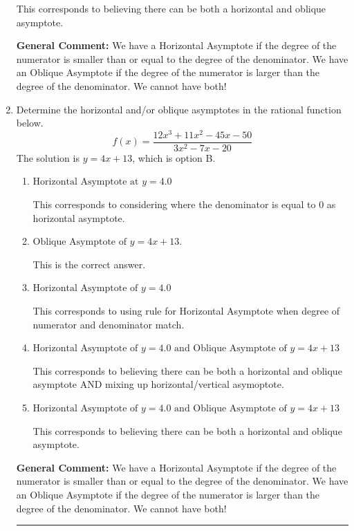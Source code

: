 \documentclass{extbook}[14pt]
\newcommand{\litem}[1]{\item #1

\rule{\textwidth}{0.4pt}}
\begin{document}
\begin{enumerate}
{\begin{enumerate}[label=\Alph*.]
This corresponds to believing there can be both a horizontal and oblique asymptote.
\end{enumerate}

\textbf{General Comment:} We have a Horizontal Asymptote if the degree of the numerator is smaller than or equal to the degree of the denominator. We have an Oblique Asymptote if the degree of the numerator is larger than the degree of the denominator. We cannot have both!
}
\litem{
Determine the horizontal and/or oblique asymptotes in the rational function below.
\[ f(x) = \frac{12x^{3} +11 x^{2} -45 x -50}{3x^{2} -7 x -20} \]The solution is \( y = 4x + 13 \), which is option B.\begin{enumerate}[label=\Alph*.]
\item \( \text{Horizontal Asymptote at } y = 4.0 \)

This corresponds to considering where the denominator is equal to 0 as horizontal asymptote.
\item \( \text{Oblique Asymptote of } y = 4x + 13. \)

This is the correct answer.
\item \( \text{Horizontal Asymptote of } y = 4.0  \)

This corresponds to using rule for Horizontal Asymptote when degree of numerator and denominator match.
\item \( \text{Horizontal Asymptote of } y = 4.0 \text{ and Oblique Asymptote of } y = 4x + 13 \)

This corresponds to believing there can be both a horizontal and oblique asymptote AND mixing up horizontal/vertical asymoptote.
\item \( \text{Horizontal Asymptote of } y = 4.0 \text{ and Oblique Asymptote of } y = 4x + 13 \)

This corresponds to believing there can be both a horizontal and oblique asymptote.
\end{enumerate}

\textbf{General Comment:} We have a Horizontal Asymptote if the degree of the numerator is smaller than or equal to the degree of the denominator. We have an Oblique Asymptote if the degree of the numerator is larger than the degree of the denominator. We cannot have both!
}
\end{enumerate}
\end{document}
